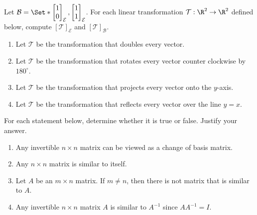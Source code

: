 \begin{exercises}
\begin{problist}
		\prob Let $\mathcal B=\Set*{\mat{1\\0}_{\mathcal E},\mat{1\\1}_{\mathcal E}}$.
		For each linear transformation
		$\mathcal T:\R^{2}\to\R^{2}$ defined below, compute
		$[\mathcal T]_{\mathcal E}$ and $[\mathcal T]_{\mathcal B}$.
		\begin{enumerate}
			\item Let $\mathcal T$ be the transformation that doubles
				every vector.

			\item Let $\mathcal T$ be the transformation that rotates
				every vector counter clockwise by $180^{\circ}$.

			\item Let $\mathcal T$ be the transformation that projects
				every vector onto the $y$-axis.

			\item Let $\mathcal T$ be the transformation that reflects
				every vector over the line $y=x$.
		\end{enumerate}

		\prob For each statement below, determine whether it is true or false. Justify your answer.
		\begin{enumerate}
			\item Any invertible $n \times n$ matrix can be viewed as
				a change of basis matrix.

			\item Any $n \times n$ matrix is similar to itself.

			\item Let $A$ be an $m \times n$ matrix. If $m
				\neq n$, then there is not matrix that is
				similar to $A$.

			\item Any invertible $n \times n$ matrix $A$ is similar to
				$A^{-1}$ since $AA^{-1}=I$.
		\end{enumerate}
	\end{problist}
\end{exercises}

